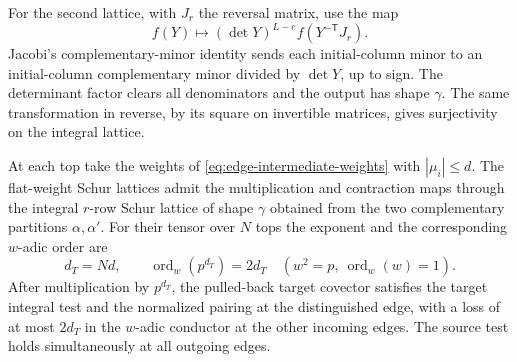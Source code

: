 For the second lattice,
with \(J_r\) the reversal matrix, use the map
\[
             f(Y)\longmapsto (\det Y)^{L-e} f(Y^{-\mathsf T}J_r).
\]
Jacobi's complementary-minor identity sends each initial-column
minor to an initial-column complementary minor divided by
\(\det Y\), up to sign. The determinant factor clears all
denominators and the output has shape \(\gamma\).
The same transformation in reverse, by its square on invertible
matrices, gives surjectivity on the integral lattice.

\begin{proposition}
\label{prop:integral-edge-contraction}
At each top take the weights of \eqref{eq:edge-intermediate-weights}
with \(|\mu_i|\le d\). The flat-weight Schur lattices admit
the multiplication and contraction maps through the integral
\(r\)-row Schur lattice of shape \(\gamma\) obtained from the
two complementary partitions \(\alpha,\alpha'\). For their tensor over \(N\) tops the exponent and the corresponding \(w\)-adic order are
\[
 d_T=Nd,\qquad \operatorname{ord}_w(p^{d_T})=2d_T\quad(w^2=p,\ \operatorname{ord}_w(w)=1).
\]
 After multiplication by \(p^{d_T}\), the pulled-back target
covector satisfies the target integral test and the normalized pairing
at the distinguished edge, with a loss of at most \(2d_T\) in the
\(w\)-adic conductor at the other incoming edges. The source test
holds simultaneously at all outgoing edges.
\end{proposition}

